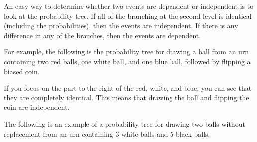 \documentclass{ximera}
\begin{document}
An easy way to determine whether two events are dependent or independent is to look at the probability tree. If all of the branching at the second level is identical (including the probabilities), then the events are independent. If there is any difference in any of the branches, then the events are dependent.

For example, the following is the probability tree for drawing a ball from an urn containing two red balls, one white ball, and one blue ball, followed by flipping a biased coin.




If you focus on the part to the right of the red, white, and blue, you can see that they are completely identical. This means that drawing the ball and flipping the coin are independent.

The following is an example of a probability tree for drawing two balls without replacement from an urn containing 3 white balls and 5 black balls.
\end{document}
